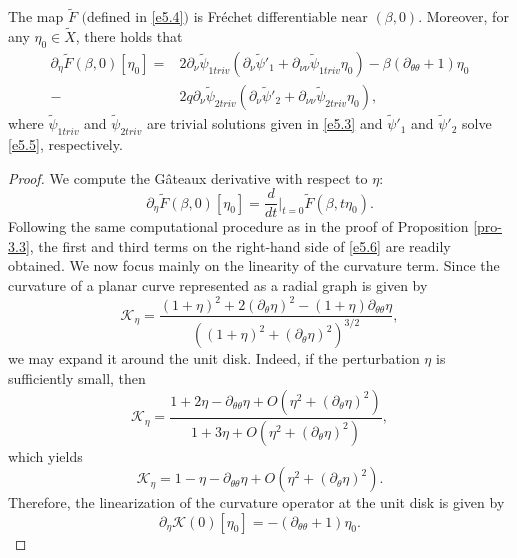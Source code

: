\documentclass[10pt,a4paper]{amsart}
\begin{document}
\begin{proposition}\label{pro-5.3}
The map \(\widetilde{F}\) $($defined in \eqref{e5.4}$)$ is Fr\'{e}chet differentiable near \((\beta,0)\). Moreover, for any \(\eta_0 \in \widetilde{X}\), there holds that
\begin{equation}\label{e5.6}
\begin{aligned}
\partial_{\eta} \widetilde{F}(\beta,0)[\eta_0] =&2\partial_{\nu}\widetilde{\psi}_{1triv}\left(\partial_{\nu}\widetilde{\psi}'_{1}+\partial_{\nu\nu}\widetilde{\psi}_{1triv} \eta_0\right)
-\beta(\partial_{\theta\theta}+1)\eta_0\\
-&2q\partial_{\nu}\widetilde{\psi}_{2triv}\left(\partial_{\nu}\widetilde{\psi}'_{2}+
\partial_{\nu\nu}\widetilde{\psi}_{2triv} \eta_0\right),
\end{aligned}
\end{equation}
where $\widetilde{\psi}_{1triv}$ and $\widetilde{\psi}_{2triv}$ are trivial solutions given in \eqref{e5.3} and \(\widetilde{\psi}'_{1}\) and \(\widetilde{\psi}'_{2}\) solve \eqref{e5.5}, respectively.
\end{proposition}

\begin{proof}
We compute the G\^{a}teaux derivative with respect to \(\eta\):
\[
\partial_\eta \widetilde{F}(\beta,0)[\eta_0] = \frac{d}{dt}\Big|_{t=0} \widetilde{F}(\beta,t\eta_0).
\]
Following the same computational procedure as in the proof of Proposition \ref{pro-3.3}, the first and third terms on the right-hand side of \eqref{e5.6} are readily obtained. We now focus mainly on the linearity of the curvature term. Since the curvature of a planar curve represented as a radial graph is given by
\[
\mathcal{K}_{\eta}
=
\frac{(1+\eta)^2+2(\partial_{\theta}\eta)^2
-(1+\eta)\partial_{\theta\theta}\eta}
{\left((1+\eta)^2+(\partial_{\theta}\eta)^2\right)^{3/2}},
\]
we may expand it around the unit disk. Indeed, if the perturbation $\eta$ is sufficiently small, then
\[
\mathcal{K}_{\eta}
=
\frac{
1+2\eta-\partial_{\theta\theta}\eta
+O\!\left(\eta^2+(\partial_{\theta}\eta)^2\right)
}
{
1+3\eta
+O\!\left(\eta^2+(\partial_{\theta}\eta)^2\right)
},
\]
which yields
\[
\mathcal{K}_{\eta}
=
1-\eta-\partial_{\theta\theta}\eta
+O\!\left(\eta^2+(\partial_{\theta}\eta)^2\right).
\]
Therefore, the linearization of the curvature operator at the unit disk is given by
\[
\partial_{\eta}\mathcal{K}(0)[\eta_0]
=
-\left(\partial_{\theta\theta}+1\right)\eta_0.
\]
\end{proof}
\end{document}
